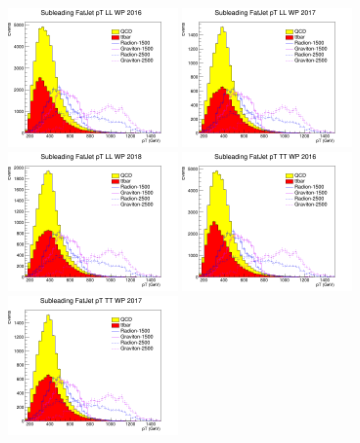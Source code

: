 \begin{figure}[!htb]
	\centering
	\includegraphics[width=0.4\textwidth]{Figures/pt1LL_16_deepTagMD_HbbvsQCD.png}
	\includegraphics[width=0.4\textwidth]{Figures/pt1LL_17_deepTagMD_HbbvsQCD.png}
	\includegraphics[width=0.4\textwidth]{Figures/pt1LL_18_deepTagMD_HbbvsQCD.png}
	\includegraphics[width=0.4\textwidth]{Figures/pt1TT_16_deepTagMD_HbbvsQCD.png}
	\includegraphics[width=0.4\textwidth]{Figures/pt1TT_17_deepTagMD_HbbvsQCD.png}

\end{figure}
